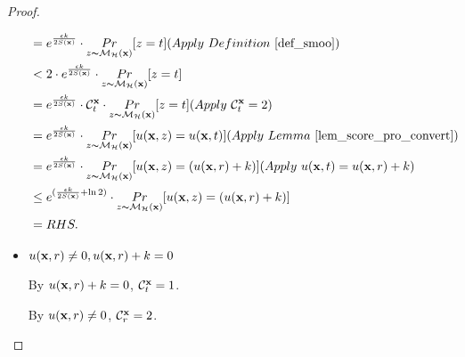 \documentclass{article}
\begin{document}
\begin{proof}
\begin{itemize}
\begin{equation*}
\begin{split}
        & = e^{\frac{\epsilon k}{2 S(\dataobs)}} \cdot \hexpmechPr{\dataobs}{z = t}       (Apply\ Definition\ \ref{def_smoo})\\
        & < 2 \cdot e^{\frac{\epsilon k}{2 S(\dataobs)}} \cdot \hexpmechPr{\dataobs}{z = t}\\
        & = e^{\frac{\epsilon k}{2 S(\dataobs)}} \cdot \cardinality{\dataobs}{t} \cdot \hexpmechPr{\dataobs}{z = t}   (Apply \ \cardinality{\dataobs}{t} = 2)\\
        & = e^{\frac{\epsilon k}{2 S(\dataobs)}} \cdot \hexpmechPr{\dataobs}{\ux{z} = \ux{t}}         (Apply \ Lemma\ \ref{lem_score_pro_convert})\\
        & = e^{\frac{\epsilon k}{2 S(\dataobs)}} \cdot \hexpmechPr{\dataobs}{\ux{z} = (\ux{r} + k)}   (Apply \ \ux{t} = \ux{r} + k)\\
        & \leq e^{(\frac{\epsilon k}{2 S(\dataobs)} + \ln 2)} \cdot \hexpmechPr{\dataobs}{\ux{z} = ( \ux{r} + k)}\\
        & = RHS.
        \end{split}
        \end{equation*}

  \item {\boldmath$u(\textbf{x}, {r}) \neq 0, u(\textbf{x}, {r}) + k = 0$} 

      By $u(\textbf{x}, {r}) + k = 0$, $\mathcal{C}^{\textbf{x}}_{t} = 1$. 

      By $u(\textbf{x}, {r}) \neq 0$, $\mathcal{C}^{\textbf{x}}_{r} = 2$.  


\end{itemize}
\end{proof}
\end{document}
